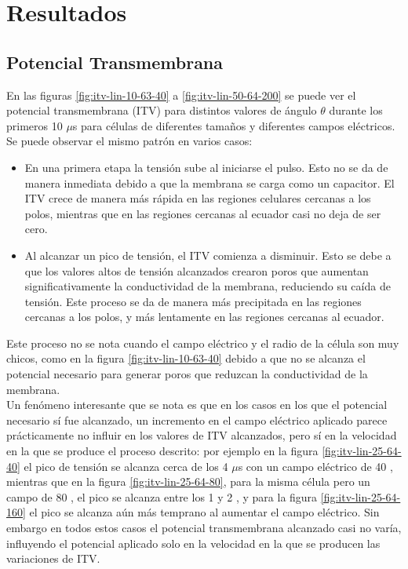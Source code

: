 \documentclass[a4paper,10pt]{article}
\begin{document}

\newpage
\section{Resultados}

\subsection{Potencial Transmembrana}


En las figuras \ref{fig:itv-lin-10-63-40} a \ref{fig:itv-lin-50-64-200} se puede ver el potencial transmembrana (ITV) para distintos valores de ángulo $\theta$ durante los primeros 10 $\mu$s para células de diferentes tamaños y diferentes campos eléctricos. Se puede observar el mismo patrón en varios casos:
\begin{itemize}
	\item En una primera etapa la tensión sube al iniciarse el pulso. Esto no se da de manera inmediata debido a que la membrana se carga como un capacitor. El ITV crece de manera más rápida en las regiones celulares cercanas a los polos, mientras que en las regiones cercanas al ecuador casi no deja de ser cero.
	\item Al alcanzar un pico de tensión, el ITV comienza a disminuir. Esto se debe a que los valores altos de tensión alcanzados crearon poros que aumentan significativamente la conductividad de la membrana, reduciendo su caída de tensión. Este proceso se da de manera más precipitada en las regiones cercanas a los polos, y más lentamente en las regiones cercanas al ecuador. 
\end{itemize}

Este proceso no se nota cuando el campo eléctrico y el radio de la célula son muy chicos, como en la figura \ref{fig:itv-lin-10-63-40} debido a que no se alcanza el potencial necesario para generar poros que reduzcan la conductividad de la membrana.\\

Un fenómeno interesante que se nota es que en los casos en los que el potencial necesario sí fue alcanzado, un incremento en el campo eléctrico aplicado parece prácticamente no influir en los valores de ITV alcanzados, pero sí en la velocidad en la que se produce el proceso descrito: por ejemplo en la figura \ref{fig:itv-lin-25-64-40} el pico de tensión se alcanza cerca de los 4 $\mu$s con un campo eléctrico de 40 \kvm, mientras que en la figura \ref{fig:itv-lin-25-64-80}, para la misma célula pero un campo de 80 \kvm, el pico se alcanza entre los 1 y 2 \usec, y para la figura \ref{fig:itv-lin-25-64-160} el pico se alcanza aún más temprano al aumentar el campo eléctrico. Sin embargo en todos estos casos el potencial transmembrana alcanzado casi no varía, influyendo el potencial aplicado solo en la velocidad en la que se producen las variaciones de ITV.\\
\end{document}
